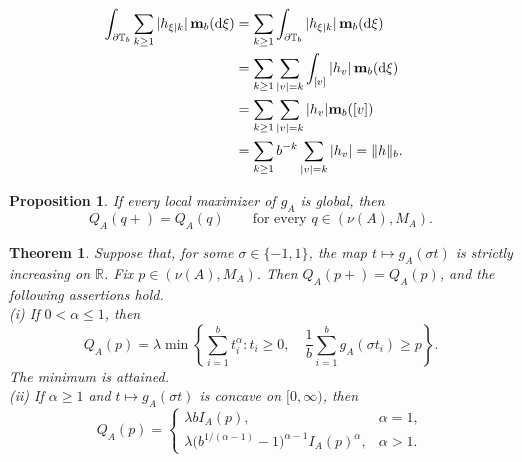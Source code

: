 \documentclass[10pt,a4paper]{amsart}
\newtheorem{proposition}{Proposition}
\newtheorem{theorem}{Theorem}
\begin{document}
\begin{align}\label{eq:path-L1}
  \int_{\partial\mathbb{T}_b}
  \sum_{k\geq1}|h_{\xi|k}|\,\mathbf m_b(\mathrm{d}\xi)
  &=
  \sum_{k\geq1}\int_{\partial\mathbb{T}_b}
  |h_{\xi|k}|\,\mathbf m_b(\mathrm{d}\xi)\cr
   &=
  \sum_{k\geq1}\sum_{|v|=k}\int_{[v]}
  |h_{v}|\,\mathbf m_b(\mathrm{d}\xi)\cr
  &=
  \sum_{k\geq1}\sum_{|v|=k}
  |h_v|\mathbf m_b([v])\cr
  &=\sum_{k\geq1}b^{-k}\sum_{|v|=k}|h_v|=\|h\|_b.
\end{align}

\begin{proposition}
\label{cor:no-suboptimal-maxima}
If every local maximizer of \(g_A\) is global, then
\[
  Q_A(q+)=Q_A(q)
  \qquad\text{for every }q\in(\nu(A),M_A).
\]
\end{proposition}

\begin{theorem}\label{thm:dimension-reduction}
Suppose that, for some \(\sigma\in\{-1,1\}\), the map
\(t\mapsto g_A(\sigma t)\) is strictly increasing on
 \(\mathbb{R}\). Fix $p\in(\nu(A),M_A)$. Then \(Q_A(p+)=Q_A(p)\), and the following assertions hold.\\
(i) If \(0<\alpha\le1\), then
\begin{equation}\label{eq:first-generation}
  Q_A(p)
  =\lambda\min\left\{
      \sum_{i=1}^b t_i^\alpha:
      t_i\ge0,\quad
      \frac1b\sum_{i=1}^b g_A(\sigma t_i)\ge p
    \right\}.
\end{equation}
The minimum is attained.\\
(ii) If $\alpha\geq1$ and \(t\mapsto g_A(\sigma t)\) is concave on
\([0,\infty)\), then
\[
  Q_A(p)=
  \begin{cases}
    \lambda b I_A(p), & \alpha=1,\\[3pt]
    \lambda\bigl(b^{1/(\alpha-1)}-1\bigr)^{\alpha-1}I_A(p)^\alpha,
      & \alpha>1.
  \end{cases}
\]
\end{theorem}
\end{document}
